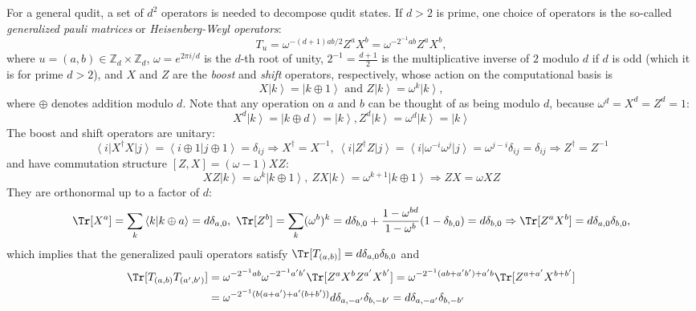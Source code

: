 \documentclass{article}
\begin{document}
For a general qudit, a set of $d^2$ operators is needed to decompose qudit states. If $d>2$ is prime, one choice of operators is the so-called \textit{generalized pauli matrices} or \textit{Heisenberg-Weyl operators}:
\begin{equation}T_{u}=\omega^{-(d+1)ab/2}Z^{a}X^{b}=\omega^{-2^{-1}ab}Z^aX^b,\end{equation}
where $u=(a,b)\in \mathbb Z_d\times \mathbb Z_d$, $\omega=e^{2\pi i/d}$ is the $d$-th root of unity, $2^{-1}=\frac{d+1}{2}$ is the multiplicative inverse of $2$ modulo $d$ if $d$ is odd (which it is for prime $d>2$), and $X$ and $Z$ are the \textit{boost} and \textit{shift} operators, respectively, whose action on the computational basis is
\begin{equation}X\left|k\right>=\left|k\oplus 1\right>\text{ and }Z\left|k\right>=\omega^k\left|k\right>,\end{equation}
where $\oplus$ denotes addition modulo $d$. Note that any operation on $a$ and $b$ can be thought of as being modulo $d$, because $\omega^d=X^d=Z^d=1$:
\begin{equation}X^d\left|k\right>=\left|k\oplus d\right>=\left|k\right>, Z^d\left|k\right>=\omega^d\left|k\right>=\left|k\right>\end{equation}
The boost and shift operators are unitary:
\begin{equation}\left <i\right|X^\dagger X\left |j\right>=\left <i\oplus 1|j\oplus 1\right>=\delta_{ij}\Rightarrow X^\dagger=X^{-1},\ \left <i\right|Z^\dagger Z\left |j\right>=\left <i\right |\omega^{-i}\omega^j\left|j\right>=\omega^{j-i}\delta_{ij}=\delta_{ij}\Rightarrow Z^\dagger=Z^{-1}\end{equation}
and have commutation structure $[Z,X]=(\omega-1)XZ$:
\begin{equation}\label{eq:XZ} XZ\left|k\right>=\omega^k\left |k\oplus 1\right>,\ ZX\left|k\right>=\omega^{k+1}\left |k\oplus 1\right>\Rightarrow ZX=\omega XZ\end{equation}
They are orthonormal up to a factor of $d$: 
\begin{equation}\label{eq:boost_shift_trace} \Tr[X^a]=\sum_k \left<k|k\oplus a\right>=d\delta_{a,0},\ \Tr[Z^b]=\sum_k (\omega^b)^k=d\delta_{b,0}+\frac{1-\omega^{bd}}{1-\omega^b}(1-\delta_{b,0})=d\delta_{b,0}\Rightarrow \Tr[Z^aX^b]=d\delta_{a,0}\delta_{b,0},\end{equation}
which implies that the generalized pauli operators satisfy $\Tr[T_{(a,b)}]=d\delta_{a,0}\delta_{b,0}$ and
\begin{align}\label{eq:generalized_pauli_prod_tr}\Tr[T_{(a,b)}T_{(a',b')}]&=\omega^{-2^{-1}ab}\omega^{-2^{-1}a'b'}\Tr[Z^aX^bZ^{a'}X^{b'}]=\omega^{-2^{-1}(ab+a'b')+a'b}\Tr[Z^{a+a'}X^{b+b'}]\\&=\omega^{-2^{-1}(b(a+a')+a'(b+b'))}d\delta_{a,-a'}\delta_{b,-b'}=d\delta_{a,-a'}\delta_{b,-b'}\end{align}
\end{document}
